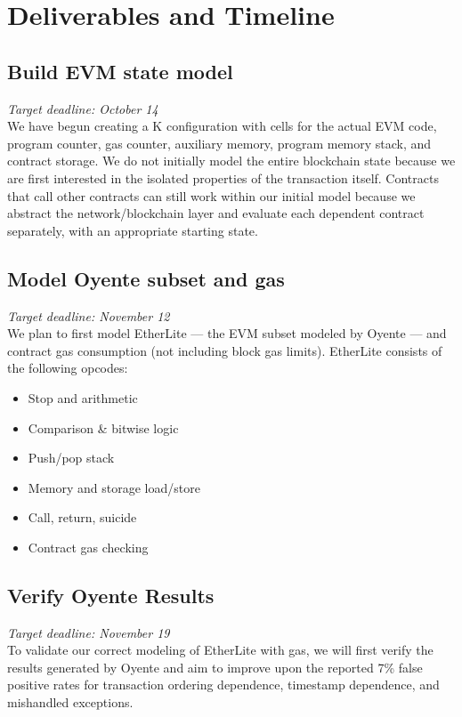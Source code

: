 \section{Deliverables and Timeline}

\subsection{Build EVM state model}
\noindent\emph{Target deadline: October 14}\\[6pt]
We have begun creating a K configuration with cells for the actual EVM code,
program counter, gas counter, auxiliary memory, program memory stack, and
contract storage.  We do not initially model the entire blockchain state
because we are first interested in the isolated properties of the transaction
itself.  Contracts that call other contracts can still work within our initial
model because we abstract the network/blockchain layer and evaluate each
dependent contract separately, with an appropriate starting state. 

\subsection{Model Oyente subset and gas}
\noindent\emph{Target deadline: November 12}\\[6pt]
We plan to first model EtherLite --- the EVM subset modeled by Oyente --- and
contract gas consumption (not including block gas limits).  EtherLite consists
of the following opcodes: 
\begin{itemize}
	\renewcommand\labelitemi{--}
	\itemsep0.2em
	\item Stop and arithmetic
	\item Comparison \& bitwise logic
	\item Push/pop stack
	\item Memory and storage load/store
	\item Call, return, suicide
	\item Contract gas checking
\end{itemize}

\subsection{Verify Oyente Results}
\noindent\emph{Target deadline: November 19}\\[6pt] To validate our correct
modeling of EtherLite with gas, we will first verify the results generated by
Oyente and aim to improve upon the reported 7\% false positive rates for
transaction ordering dependence, timestamp dependence, and mishandled
exceptions.

